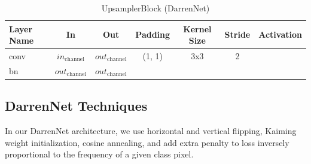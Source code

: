 \begin{table}[H]
	\setlength{\abovecaptionskip}{10pt}
	\centering
	\begin{tabular}{|l|c|c|c|c|c|c|}
		\hline
		\textbf{Layer Name} & \textbf{In}            & \textbf{Out}           & \textbf{Padding} & \textbf{Kernel Size} & \textbf{Stride} & \textbf{Activation} \\
		\hline
		conv                & $in_{\text{channel}}$  & $out_{\text{channel}}$ & (1, 1)           & 3x3               & 2               &                    \\
		\hline
		bn                  & $out_{\text{channel}}$ & $out_{\text{channel}}$ &                 &                     &                &                    \\
		\hline
	\end{tabular}
	\caption{UpsamplerBlock (DarrenNet)}
\end{table}

\subsection*{DarrenNet Techniques}
In our DarrenNet architecture, we use horizontal and vertical flipping, Kaiming weight initialization, cosine annealing, and add extra penalty to loss inversely proportional to the frequency of a given class pixel.

